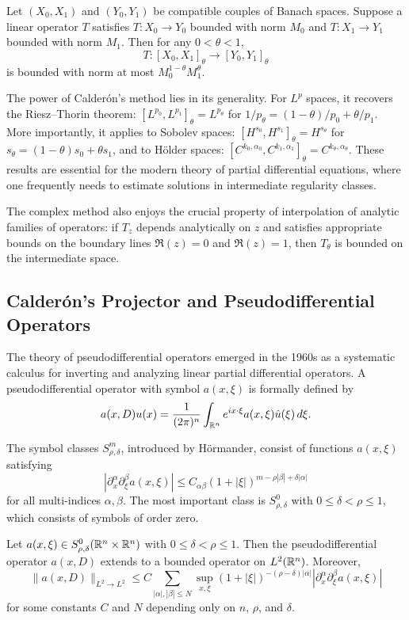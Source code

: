 \begin{theorem}
Let $(X_0, X_1)$ and $(Y_0, Y_1)$ be compatible couples of Banach spaces. Suppose a linear operator $T$ satisfies $T: X_0 \to Y_0$ bounded with norm $M_0$ and $T: X_1 \to Y_1$ bounded with norm $M_1$. Then for any $0 < \theta < 1$,
\[
T: [X_0, X_1]_\theta \to [Y_0, Y_1]_\theta
\]
is bounded with norm at most $M_0^{1-\theta} M_1^\theta$.
\end{theorem}

The power of Calder\'{o}n's method lies in its generality. For $L^p$ spaces, it recovers the Riesz--Thorin theorem: $[L^{p_0}, L^{p_1}]_\theta = L^{p_\theta}$ for $1/p_\theta = (1-\theta)/p_0 + \theta/p_1$. More importantly, it applies to Sobolev spaces: $[H^{s_0}, H^{s_1}]_\theta = H^{s_\theta}$ for $s_\theta = (1-\theta)s_0 + \theta s_1$, and to H\"older spaces: $[C^{k_0,\alpha_0}, C^{k_1,\alpha_1}]_\theta = C^{k_\theta,\alpha_\theta}$. These results are essential for the modern theory of partial differential equations, where one frequently needs to estimate solutions in intermediate regularity classes.

The complex method also enjoys the crucial property of interpolation of analytic families of operators: if $T_z$ depends analytically on $z$ and satisfies appropriate bounds on the boundary lines $\Re(z) = 0$ and $\Re(z) = 1$, then $T_\theta$ is bounded on the intermediate space.

\subsection{Calder\'{o}n's Projector and Pseudodifferential Operators}

The theory of pseudodifferential operators emerged in the 1960s as a systematic calculus for inverting and analyzing linear partial differential operators. A pseudodifferential operator with symbol $a(x,\xi)$ is formally defined by
\[
a(x,D)u(x) = \frac{1}{(2\pi)^n} \int_{\mathbb{R}^n} e^{i x \cdot \xi} a(x,\xi) \hat u(\xi) \,d\xi.
\]

The symbol classes $S^m_{\rho,\delta}$, introduced by H\"ormander, consist of functions $a(x,\xi)$ satisfying
\[
|\partial_x^\alpha \partial_\xi^\beta a(x,\xi)| \leq C_{\alpha\beta} (1+|\xi|)^{m - \rho|\beta| + \delta|\alpha|}
\]
for all multi-indices $\alpha, \beta$. The most important class is $S^0_{\rho,\delta}$ with $0 \leq \delta < \rho \leq 1$, which consists of symbols of order zero.

\begin{theorem}
Let $a(x,\xi) \in S^0_{\rho,\delta}(\mathbb{R}^n \times \mathbb{R}^n)$ with $0 \leq \delta < \rho \leq 1$. Then the pseudodifferential operator $a(x,D)$ extends to a bounded operator on $L^2(\mathbb{R}^n)$. Moreover,
\[
\|a(x,D)\|_{L^2 \to L^2} \leq C \sum_{|\alpha|,|\beta| \leq N} \sup_{x,\xi} (1+|\xi|)^{-(\rho-\delta)|\alpha|} |\partial_x^\alpha \partial_\xi^\beta a(x,\xi)|
\]
for some constants $C$ and $N$ depending only on $n$, $\rho$, and $\delta$.
\end{theorem}

